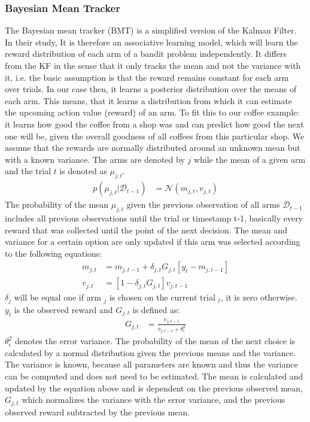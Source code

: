 \subsubsection{Bayesian Mean Tracker} %
 
The Bayesian mean tracker (BMT) \citep{speekenbrink2015uncertainty} is a simplified version of the Kalman Filter. In their study, \citeauthor{speekenbrink2015uncertainty}
It is therefore an associative learning model, which will learn the reward distribution of each arm of a bandit problem independently. It differs from the KF in the sense that it only tracks the mean and not the variance with it, i.e. the basic assumption is that the reward remains constant for each arm over trials. 
In our case then, it learns a posterior distribution over the means of each arm. 
This means, that it learns a distribution from which it can estimate the upcoming action value (reward) of an arm. To fit this to our coffee example: it learns how good the coffee from a shop was and can predict how good the next one will be, given the overall goodness of all coffees from this particular shop. We assume that the rewards are normally distributed around an unknown mean but with a known variance. The arms are denoted by $j$ while the mean of a given arm and the trial $t$ is denoted as $\mu_{j,t}$.
\begin{align}
    p(\mu_{j,t}|\mathcal{D}_{t-1}) &= \mathcal{N}(m_{j,t},v_{j,t})
\end{align}
The probability of the mean $\mu_{j,t}$ given the previous observation of all arms $\mathcal{D}_{t-1}$ includes all previous observations until the trial or timestamp t-1, basically every reward that was collected until the point of the next decision. The mean and variance for a certain option are only updated if this arm was selected according to the following equations: 
\begin{align}
    m_{j,t} &= m_{j,t-1} + \delta_{j,t}G_{j,t}\left[y_t-m_{j,t-1}\right]
    \\
    v_{j,t} &= \left[1 - \delta_{j,t}G_{j,t}\right]v_{j,t-1} 
\end{align}
$\delta_j$ will be equal one if arm $_j$ is chosen on the current trial $_t$, it is zero otherwise. $y_t$ is the observed reward and $G_{j,t}$ is defined as: 
\begin{align}
G_{j,t} &= \frac{v_{j,t-1}}{v_{j,t-1}+ \theta_\epsilon^2}
\end{align}
$\theta_\epsilon^2$ denotes the error variance. The probability of the mean of the next choice is calculated by a normal distribution given the previous means and the variance. The variance is known, because all parameters are known and thus the variance can be computed and does not need to be estimated. The mean is calculated and updated by the equation above and is dependent on the previous observed mean, $G_{j,t}$ which normalizes the variance with the error variance, and the previous observed reward subtracted by the previous mean.
